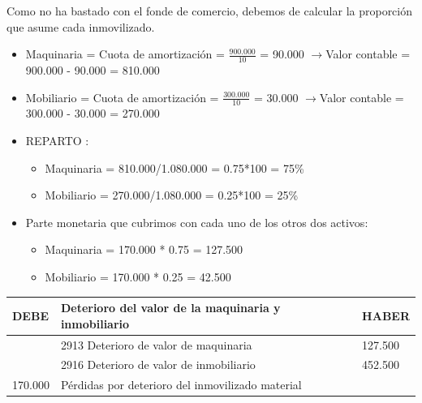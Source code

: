 \documentclass[a4paper,12pt]{article}
\newcommand{\VC}{Valor contable = }
\newcommand{\cuotaamort}{Cuota de amortización = }
\newcommand{\myequation}[2]{\ensuremath{\frac{#1}{#2}}}
\newcommand{\flechita}{$\rightarrow$}
\begin{document}
Como no ha bastado con el fonde de comercio, debemos de calcular la proporción que asume cada inmovilizado.
\begin{itemize}
    \item Maquinaria = \cuotaamort \myequation{900.000}{10} = 90.000 \flechita \VC 900.000 - 90.000 = 810.000
    \item Mobiliario = \cuotaamort \myequation{300.000}{10} = 30.000 \flechita \VC 300.000 - 30.000 = 270.000
    \item REPARTO :
    \begin{itemize}
        \item Maquinaria = 810.000/1.080.000 = 0.75*100 = 75\%
        \item Mobiliario = 270.000/1.080.000 = 0.25*100 = 25\%
    \end{itemize}
    \item Parte monetaria que cubrimos con cada uno de los otros dos activos:
    \begin{itemize}
        \item Maquinaria = 170.000 * 0.75 = 127.500 
        \item Mobiliario = 170.000 * 0.25 = 42.500 
    \end{itemize}
\end{itemize}
\begin{table}[H]
    \centering
    \begin{tabular}{|p{3cm}|p{6cm}|p{3cm}|}
    \hline
    \textbf{DEBE} & \textbf{Deterioro del valor de la maquinaria y inmobiliario} & \textbf{HABER} \\
    \hline
    & 2913 Deterioro de valor de maquinaria& 127.500\\
    \hline
    & 2916 Deterioro de valor de inmobiliario& 452.500\\
    \hline
    170.000& Pérdidas por deterioro del inmovilizado material& \\
    \hline
    \end{tabular}
\end{table}
\end{document}
